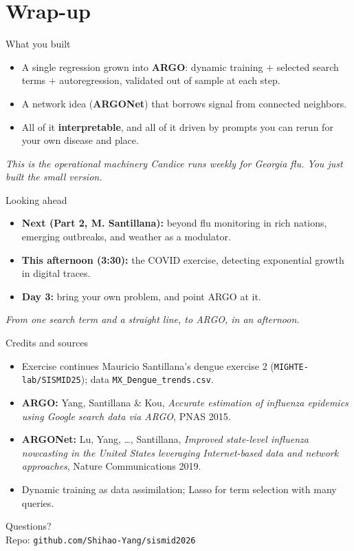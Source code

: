 \documentclass[aspectratio=169,11pt]{beamer}
\begin{document}
\section{Wrap-up}

\begin{frame}{What you built}
  \begin{itemize}
    \item A single regression grown into \textbf{ARGO}: dynamic training $+$ selected search
          terms $+$ autoregression, validated out of sample at each step.
    \item A network idea (\textbf{ARGONet}) that borrows signal from connected neighbors.
    \item All of it \textbf{interpretable}, and all of it driven by prompts you can rerun for
          your own disease and place.
  \end{itemize}
  \vfill
  \begin{center}
    \itshape This is the operational machinery Candice runs weekly for Georgia flu. You just
    built the small version.
  \end{center}
\end{frame}

\begin{frame}{Looking ahead}
  \begin{itemize}
    \item \textbf{Next (Part 2, M. Santillana):} beyond flu monitoring in rich nations,
          emerging outbreaks, and weather as a modulator.
    \item \textbf{This afternoon (3:30):} the COVID exercise, detecting exponential growth in
          digital traces.
    \item \textbf{Day 3:} bring your own problem, and point ARGO at it.
  \end{itemize}
  \vfill
  \begin{center}
    \itshape From one search term and a straight line, to ARGO, in an afternoon.
  \end{center}
\end{frame}

\begin{frame}{Credits and sources}
  \footnotesize
  \begin{itemize}
    \item Exercise continues Mauricio Santillana's dengue exercise 2
          (\texttt{MIGHTE-lab/SISMID25}); data \texttt{MX\_Dengue\_trends.csv}.
    \item \textbf{ARGO:} Yang, Santillana \& Kou, \emph{Accurate estimation of influenza
          epidemics using Google search data via ARGO}, PNAS 2015.
    \item \textbf{ARGONet:} Lu, Yang, \ldots, Santillana, \emph{Improved state-level
          influenza nowcasting in the United States leveraging Internet-based data and
          network approaches}, Nature Communications 2019.
    \item Dynamic training as data assimilation; Lasso for term selection with many queries.
  \end{itemize}
\end{frame}

\begin{frame}[standout]
  Questions?\\[0.4em]
  \small Repo: \texttt{github.com/Shihao-Yang/sismid2026}
\end{frame}
\end{document}
